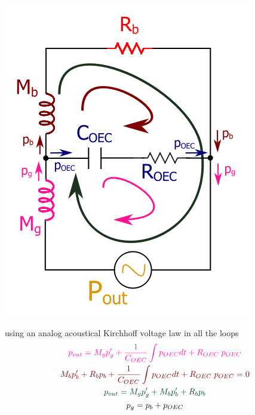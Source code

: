 \begin{itemize}
\begin{figure}[H]
\begin{minipage}{.48\linewidth}
        \caption{\cite{OEC_circuit}}
        \label{fig:oec_new}
    \end{minipage}
    \end{figure}    
    
    \vspace{5pt}
    
    \begin{minipage}{0.25\textwidth}
        \includegraphics[scale=1.2]{Images/mallas.png}
    \label{fig:mallas}
    \end{minipage} \hspace{1pt}
    \begin{minipage}{0.6\textwidth}
    using an analog acoustical Kirchhoff voltage law in all the loops\\
        \begin{gather}
        \color{mypink} p_{out} = M_g p_g'+ \frac{1}{C_{OEC}} \int p_{OEC} dt +R_{OEC} \; p_{OEC}\\ %
        \color{myred}M_b p_b'+R_bp_b+\frac{1}{C_{OEC}}\int p_{OEC} dt +R_{OEC} \; p_{OEC}=0\\
        \color{mygreen}p_{out} = M_g p_g'+M_bp_b'+R_bp_b\\
        p_g = p_b+p_{OEC}
    \end{gather}
    \vspace{50pt}
    \end{minipage}
    

\end{itemize}
